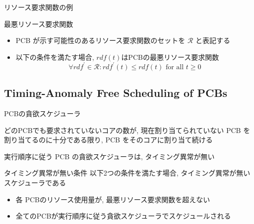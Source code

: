 \begin{frame}{リソース要求関数の例}
\end{frame}

\begin{frame}{最悪リソース要求関数}
    \begin{definition}[最悪リソース要求関数]
        \setlength{\linewidth}{0.98\columnwidth}
        \begin{itemize}
            \item PCB が示す可能性のあるリソース要求関数のセットを $\mathcal{R}$ と表記する
            \item 以下の条件を満たす場合, $rdf(t)$はPCBの最悪リソース要求関数
                  \begin{equation*}
                      \forall rdf^{\prime} \in \mathcal{R}: rdf^{\prime}(t) \leq rdf(t) \text { for all } t \geq 0
                  \end{equation*}
        \end{itemize}
    \end{definition}
\end{frame}


\subsection{Timing-Anomaly Free Scheduling of PCBs}
\label{ssec: Timing-Anomaly Free Scheduling of PCBs}

\begin{frame}{PCBの貪欲スケジューラ}
    \begin{definition}[PCBの貪欲スケジューラ]
        どのPCBでも要求されていないコアの数が, 現在割り当てられていない PCB を割り当てるのに十分である限り, PCB をそのコアに割り当て続ける
    \end{definition}
    \begin{theorem}[]
        実行順序に従う PCB の貪欲スケジューラは, タイミング異常が無い
    \end{theorem}
\end{frame}

\begin{frame}{タイミング異常が無い条件}
    以下2つの条件を満たす場合, タイミング異常が無いスケジューラである
    \begin{itemize}
        \item 各 PCBのリソース使用量が, 最悪リソース要求関数を超えない
        \item 全てのPCBが実行順序に従う貪欲スケジューラでスケジュールされる
    \end{itemize}
\end{frame}
